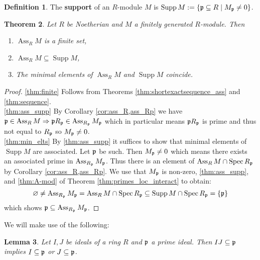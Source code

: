 \documentclass[12pt]{article}
\theoremstyle{plain}
\newtheorem{thm}{Theorem}[subsection] %
\newtheorem{lemma}[thm]{Lemma}
\theoremstyle{definition}
\newtheorem{defn}[thm]{Definition} %
\begin{document}
	\begin{defn}
		The \textbf{support} of an $R$-module $M$ is $\operatorname{Supp}M := \lbrace \frak{p} \subseteq R \mid M_\frak{p} \neq 0\rbrace$.
	\end{defn}
	\begin{thm}
		\label{thm:fin_sub_min}
		Let $R$ be Noetherian and $M$ a finitely generated $R$-module. Then
		\begin{enumerate}
			\item\label{thm:finite} $\operatorname{Ass}_RM$ is a finite set,
			\item\label{thm:ass_supp} $\operatorname{Ass}_RM \subseteq \operatorname{Supp}M$,
			\item\label{thm:min_elts} The minimal elements of $\operatorname{Ass}_RM$ and $\operatorname{Supp}M$ coincide.
		\end{enumerate}
	\end{thm}
	\begin{proof}
		\eqref{thm:finite} Follows from Theorems \ref{thm:shortexactsequence_ass} and \ref{thm:sequence}.\\
		\eqref{thm:ass_supp} By Corollary \ref{cor:ass_R,ass_Rp} we have $\frak{p} \in \operatorname{Ass}_RM \Rightarrow \frak{p}R_{\frak{p}} \in \operatorname{Ass}_{R_\frak{p}}M_{\frak{p}}$ which in particular means $\frak{p}R_{\frak{p}}$ is prime and thus not equal to $R_\frak{p}$ so $M_\frak{p} \neq 0$.\\
		\eqref{thm:min_elts} By \eqref{thm:ass_supp} it suffices to show that minimal elements of $\operatorname{Supp}M$ are associated. Let $\frak{p}$ be such. Then $M_\frak{p} \neq 0$ which means there exists an associated prime in $\operatorname{Ass}_{R_\frak{p}}M_\frak{p}$. Thus there is an element of $\operatorname{Ass}_RM \cap \operatorname{Spec}R_\frak{p}$ by Corollary \ref{cor:ass_R,ass_Rp}. We use that $M_\frak{p}$ is non-zero, \eqref{thm:ass_supp}, and \eqref{thm:A-mod} of Theorem \ref{thm:primes_loc_interact} to obtain:
		\[\varnothing \neq \operatorname{Ass}_{R_\frak{p}}M_\frak{p} = \operatorname{Ass}_RM \cap \operatorname{Spec}R_{\frak{p}} \subseteq \operatorname{Supp}M \cap \operatorname{Spec}R_{\frak{p}} = \lbrace \frak{p} \rbrace\]
		which shows $\frak{p} \subseteq \operatorname{Ass}_{R_\frak{p}}M_\frak{p}$.
	\end{proof}
	We will make use of the following:
	\begin{lemma}
		\label{lem:product}
		Let $I,J$ be ideals of a ring $R$ and $\frak{p}$ a prime ideal. Then $IJ \subseteq \frak{p}$ implies $I \subseteq \frak{p}$ or $J \subseteq \frak{p}$.
	\end{lemma}
\end{document}
